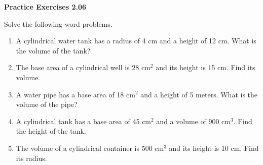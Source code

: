 \vspace{0.3ex}
\noindent\textbf{Practice Exercises 2.06}

\vspace{0.2ex}


Solve the following word problems.

\begin{enumerate}[noitemsep, label = \color{blue}\arabic*. ]
    \item A cylindrical water tank has a radius of 4 cm and a height of 12 cm. What is the volume of the tank?
    \item The base area of a cylindrical well is 28 cm\(^{2}\) and its height is 15 cm. Find its volume.
    \item A water pipe has a base area of 18 cm\(^{2}\) and a height of 5 meters. What is the volume of the pipe?
    \item A cylindrical tank has a base area of 45 cm\(^{2}\) and a volume of 900 cm\(^{3}\). Find the height of the tank.
    \item The volume of a cylindrical container is 500 cm\(^{3}\) and its height is 10 cm. Find its radius.
\end{enumerate}



